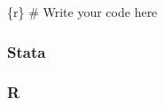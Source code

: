 \documentclass[
  letterpaper,
  DIV=11,
  numbers=noendperiod,
  oneside]{scrreprt}
\newenvironment{Shaded}{\begin{snugshade}}{\end{snugshade}}
\newcommand{\CommentTok}[1]{\textcolor[rgb]{0.37,0.37,0.37}{#1}}
\newcommand{\InformationTok}[1]{\textcolor[rgb]{0.37,0.37,0.37}{#1}}
\begin{document}
\begin{Shaded}
\begin{Highlighting}[]
\InformationTok{\textasciigrave{}\textasciigrave{}\textasciigrave{}\{r\}}
\CommentTok{\# Write your code here}
\InformationTok{\textasciigrave{}\textasciigrave{}\textasciigrave{}}
\end{Highlighting}
\end{Shaded}

\subsubsection{Stata}

\subsubsection{R}
\end{document}
